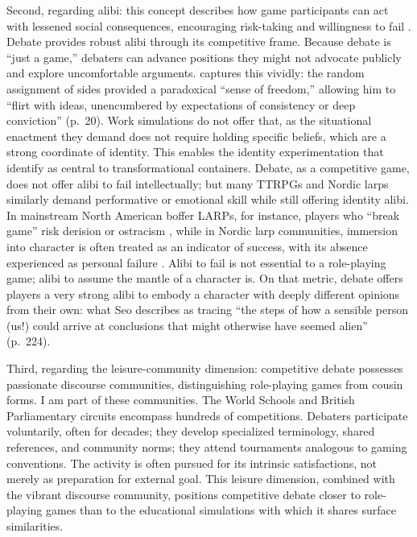 Second, regarding alibi: this concept describes how game participants can act with lessened social consequences, encouraging risk-taking and willingness to fail \parencite{deterding2017alibis}. Debate provides robust alibi through its competitive frame. Because debate is ``just a game,'' debaters can advance positions they might not advocate publicly and explore uncomfortable arguments. \textcite{seo2022good} captures this vividly: the random assignment of sides provided a paradoxical ``sense of freedom,'' allowing him to ``flirt with ideas, unencumbered by expectations of consistency or deep conviction'' (p.~20). Work simulations do not offer that, as the situational enactment they demand does not require holding specific beliefs, which are a strong coordinate of identity. This enables the identity experimentation that \textcite{bowman2025transformative} identify as central to transformational containers. Debate, as a competitive game, does not offer alibi to fail intellectually; but many TTRPGs and Nordic larps similarly demand performative or emotional skill while still offering identity alibi. In mainstream North American boffer LARPs, for instance, players who ``break game'' risk derision or ostracism \parencite{brown2016culture}, while in Nordic larp communities, immersion into character is often treated as an indicator of success, with its absence experienced as personal failure \parencite{harder2018larp,pohjola2015steering}. Alibi to fail is not essential to a role-playing game; alibi to assume the mantle of a character is. On that metric, debate offers players a very strong alibi to embody a character with deeply different opinions from their own: what Seo describes as tracing ``the steps of how a sensible person (us!) could arrive at conclusions that might otherwise have seemed alien'' (p.~224).

Third, regarding the leisure-community dimension: competitive debate possesses passionate discourse communities, distinguishing role-playing games from cousin forms. I am part of these communities. The World Schools and British Parliamentary circuits encompass hundreds of competitions. Debaters participate voluntarily, often for decades; they develop specialized terminology, shared references, and community norms; they attend tournaments analogous to gaming conventions. The activity is often pursued for its intrinsic satisfactions, not merely as preparation for external goal. This leisure dimension, combined with the vibrant discourse community, positions competitive debate closer to role-playing games than to the educational simulations with which it shares surface similarities.

